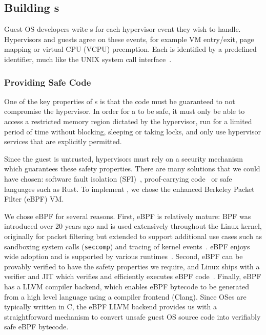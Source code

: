 \documentclass[11pt]{article}
\begin{document}
\subsection{Building \Hypercallback{}s}
\label{sec:building}

Guest OS developers write \hypercallback{}s for each hypervisor event
they wish to handle. Hypervisors and guests agree on these events, for example  
VM entry/exit, page mapping or virtual CPU (VCPU) preemption.
Each \hypercallback{} is identified by a predefined identifier, much
like the UNIX system call interface~\cite{ritchie1978unix}. 

\subsubsection{Providing Safe Code}

One of the key properties of \hypercallback{}s is that the code
must be guaranteed to not compromise the hypervisor. In order
for a \hypercallback{} to be safe, it must only be able to access a
restricted memory region dictated by the hypervisor, 
run for a limited period of time without blocking,
sleeping or taking locks, and only use hypervisor services that
are explicitly permitted.

Since the guest is untrusted, hypervisors must rely on
a security mechanism which guarantees these safety properties. There are many
solutions that we could have chosen: software fault isolation (SFI)~\cite{wahbe1994efficient},
proof-carrying code~\cite{necula1997proof} or safe languages such as Rust. 
To implement , we chose the enhanced Berkeley Packet Filter (eBPF) VM.

We chose eBPF for several reasons. First, eBPF is relatively mature: 
BPF was introduced over 20 years ago and is used extensively 
throughout the Linux kernel, originally for packet filtering but
extended to support additional use cases such as 
sandboxing system calls (\texttt{seccomp}) and tracing of kernel 
events~\cite{bcc}. eBPF enjoys wide adoption and is supported by various 
runtimes~\cite{bigswitch15ubpf,monnet17rbpf}.
Second, eBPF can be provably verified to have the safety properties we
require, and Linux ships with a verifier and JIT which verifies 
 and efficiently executes eBPF code~\cite{wang2014jitk}.
Finally, eBPF has a LLVM compiler backend, which enables eBPF bytecode 
to be generated from a high level language using a compiler frontend
(Clang). Since OSes are typically written in C, the eBPF LLVM backend 
provides us with a straightforward mechanism to convert unsafe guest OS source 
code into verifiably safe eBPF bytecode. 
\end{document}
